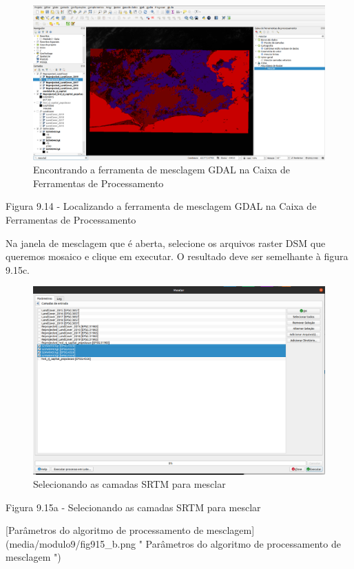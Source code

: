 \documentclass[
]{book}
\begin{document}
\begin{figure}
\centering
\includegraphics{media/modulo9/fig914.png}
\caption{Encontrando a ferramenta de mesclagem GDAL na Caixa de Ferramentas de Processamento}
\end{figure}

Figura 9.14 - Localizando a ferramenta de mesclagem GDAL na Caixa de Ferramentas de Processamento

Na janela de mesclagem que é aberta, selecione os arquivos raster DSM que queremos mosaico e clique em executar. O resultado deve ser semelhante à figura 9.15c.

\begin{figure}
\centering
\includegraphics{media/modulo9/fig915_a.png}
\caption{Selecionando as camadas SRTM para mesclar}
\end{figure}

Figura 9.15a - Selecionando as camadas SRTM para mesclar

{[}Parâmetros do algoritmo de processamento de mesclagem{]}(media/modulo9/fig915\_b.png " Parâmetros do algoritmo de processamento de mesclagem ")
\end{document}
